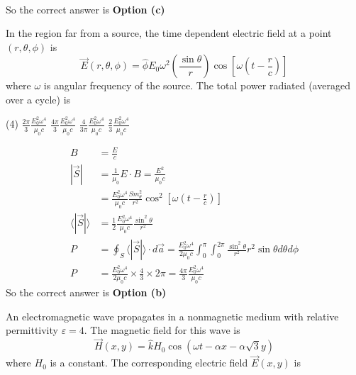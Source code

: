 \begin{enumerate}
\begin{answer}
\begin{align*}
	\end{align*}
	So the correct answer is \textbf{Option (c)}
\end{answer}
	\begin{minipage}{\textwidth}
		\item In the region far from a source, the time dependent electric field at a point $(r, \theta, \phi)$ is
		$$
		\vec{E}(r, \theta, \phi)=\hat{\phi} E_{0} \omega^{2}\left(\frac{\sin \theta}{r}\right) \cos \left[\omega\left(t-\frac{r}{c}\right)\right]
		$$
		where $\omega$ is angular frequency of the source. The total power radiated (averaged over a cycle) is
	\end{minipage}
	\begin{tasks}(4)
		\task[\textbf{a.}] $\frac{2 \pi}{3} \frac{E_{0}^{2} \omega^{4}}{\mu_{0} c}$
		\task[\textbf{b.}]$\frac{4 \pi}{3} \frac{E_{0}^{2} \omega^{4}}{\mu_{0} c}$
		\task[\textbf{c.}]$\frac{4}{3 \pi} \frac{E_{0}^{2} \omega^{4}}{\mu_{0} c}$
		\task[\textbf{d.}]$\frac{2}{3} \frac{E_{0}^{2} \omega^{4}}{\mu_{0} c}$
	\end{tasks}
\begin{answer}
	\begin{align*}
	B&=\frac{E}{c}\\
	|\vec{S}|&=\frac{1}{\mu_{0}} E \cdot B=\frac{E^{2}}{\mu_{0} c}\\&=\frac{E_{0}^{2} \omega^{4}}{\mu_{0} c} \frac{S m_{\theta}^{2}}{r^{2}} \cos ^{2}\left[\omega\left(t-\frac{r}{c}\right)\right]\\
	\langle|\vec{S}|\rangle&=\frac{1}{2} \frac{E_{0}^{2} \omega^{4}}{\mu_{0} c} \frac{\sin ^{2} \theta}{r^{2}}\\
	P&=\oint_{S}\langle|\vec{S}|\rangle \cdot d \vec{a}=\frac{E_{0}^{2} \omega^{4}}{2 \mu_{0} c} \int_{0}^{\pi} \int_{0}^{2 \pi} \frac{\sin ^{2} \theta}{r^{2}} r^{2} \sin \theta d \theta d \phi\\
	P&=\frac{E_{0}^{2} \omega^{4}}{2 \mu_{0} c} \times \frac{4}{3} \times 2 \pi=\frac{4 \pi}{3} \frac{E_{0}^{2} \omega^{4}}{\mu_{0} c}
	\end{align*}
	So the correct answer is \textbf{Option (b)}
\end{answer}
	\begin{minipage}{\textwidth}
		\item An electromagnetic wave propagates in a nonmagnetic medium with relative permittivity $\varepsilon=4$. The magnetic field for this wave is
		$$
		\vec{H}(x, y)=\hat{k} H_{0} \cos (\omega t-\alpha x-\alpha \sqrt{3} y)
		$$
		where $H_{0}$ is a constant. The corresponding electric field $\vec{E}(x, y)$ is

\end{minipage}
\end{enumerate}
